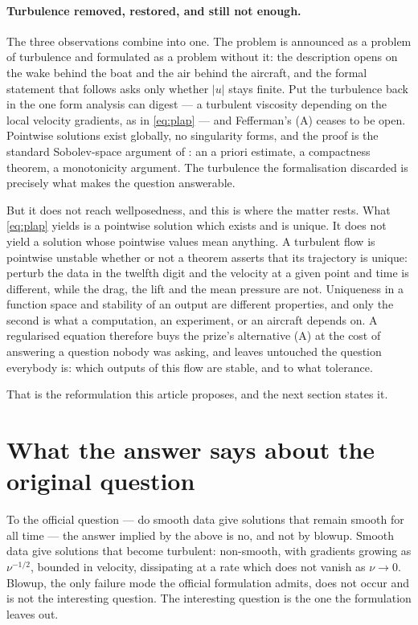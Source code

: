 \documentclass[11pt]{article}
\begin{document}
\paragraph{Turbulence removed, restored, and still not enough.} The three observations combine into
one. The problem is announced as a problem of turbulence and formulated as a problem without it: the
description opens on the wake behind the boat and the air behind the aircraft, and the formal
statement that follows asks only whether $|u|$ stays finite. Put the turbulence back in the one form
analysis can digest --- a turbulent viscosity depending on the local velocity gradients, as in
\eqref{eq:plap} --- and Fefferman's (A) ceases to be open. Pointwise solutions exist globally, no
singularity forms, and the proof is the standard Sobolev-space argument of \cite{lions}: an a priori
estimate, a compactness theorem, a monotonicity argument. The turbulence the formalisation discarded
is precisely what makes the question answerable.

But it does not reach wellposedness, and this is where the matter rests. What
\eqref{eq:plap} yields is a pointwise solution which exists and is unique. It does not yield a
solution whose pointwise values mean anything. A turbulent flow is pointwise unstable whether or not
a theorem asserts that its trajectory is unique: perturb the data in the twelfth digit and the
velocity at a given point and time is different, while the drag, the lift and the mean pressure are
not. Uniqueness in a function space and stability of an output are different properties, and only
the second is what a computation, an experiment, or an aircraft depends on. A regularised equation
therefore buys the prize's alternative (A) at the cost of answering a question nobody was asking,
and leaves untouched the question everybody is: which outputs of this flow are stable, and to what
tolerance.

That is the reformulation this article proposes, and the next section states it.

\section{What the answer says about the original question}

To the official question --- do smooth data give solutions that remain smooth for all time --- the
answer implied by the above is no, and not by blowup. Smooth data give solutions that become
turbulent: non-smooth, with gradients growing as $\nu^{-1/2}$, bounded in velocity, dissipating at a
rate which does not vanish as $\nu\to0$. Blowup, the only failure mode the official formulation
admits, does not occur and is not the interesting question. The interesting question is the one the
formulation leaves out.
\end{document}
